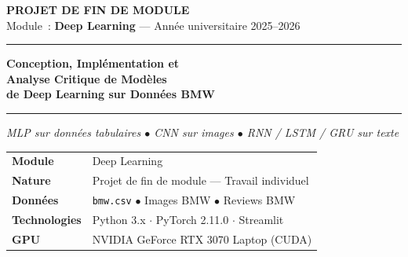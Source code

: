 \documentclass[12pt,a4paper]{report}
\begin{document}

\begin{titlepage}
\vspace{1.2cm}
\begin{center}
{\color{bmwblue}\normalsize\bfseries\MakeUppercase{Projet de Fin de Module}}\\[0.2cm]
{\color{bmwaccent}\normalsize Module~: \textbf{Deep Learning} --- Année universitaire 2025--2026}
\vspace{0.8cm}

{\color{bmwaccent}\rule{0.85\textwidth}{1.2pt}}
\vspace{0.6cm}

{\color{bmwblue}\LARGE\bfseries
Conception, Implémentation et\\[0.25cm]
Analyse Critique de Modèles\\[0.25cm]
de Deep Learning sur Données BMW}

\vspace{0.5cm}
{\color{bmwaccent!70}\rule{0.55\textwidth}{0.6pt}}
\vspace{0.4cm}

{\color{bmwaccent}\large\itshape
MLP sur données tabulaires \quad$\bullet$\quad
CNN sur images \quad$\bullet$\quad
RNN / LSTM / GRU sur texte}
\end{center}

\vspace{1cm}
\begin{center}
\begin{tcolorbox}[colback=bmwlight!30,colframe=bmwblue,
  arc=6pt,boxrule=1pt,width=0.85\textwidth,sharp corners=south]
\renewcommand{\arraystretch}{1.4}
\begin{tabularx}{\textwidth}{@{\hspace{10pt}}lX@{\hspace{10pt}}}
\textcolor{bmwblue}{\bfseries\Large Module}   & Deep Learning \\
\textcolor{bmwblue}{\bfseries Nature}         & Projet de fin de module --- Travail individuel \\
\textcolor{bmwblue}{\bfseries Données}        & \texttt{bmw.csv} $\bullet$ Images BMW $\bullet$ Reviews BMW \\
\textcolor{bmwblue}{\bfseries Technologies}   & Python 3.x \quad $\cdot$ \quad PyTorch 2.11.0 \quad $\cdot$ \quad Streamlit \\
\textcolor{bmwblue}{\bfseries GPU}            & NVIDIA GeForce RTX 3070 Laptop (CUDA) \\
\end{tabularx}
\end{tcolorbox}
\end{center}


\end{titlepage}
\end{document}
